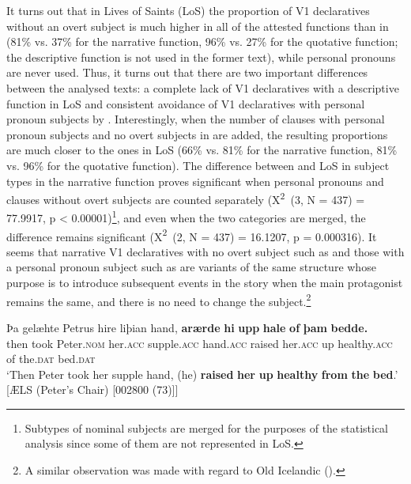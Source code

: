 \documentclass[output=paper,colorlinks,citecolor=brown]{langscibook}
\begin{document}
{It turns out that in Lives of Saints (LoS) the proportion of V1 declaratives without an overt subject is much higher in all of the attested functions than in  (81\% vs. 37\% for the narrative function, 96\% vs. 27\% for the quotative function; the descriptive function is not used in the former text), while personal pronouns are never used. Thus, it turns out that there are two important differences between the analysed texts: a complete lack of V1 declaratives with a descriptive function in LoS and consistent avoidance of V1 declaratives with personal pronoun subjects by . Interestingly, when the number of clauses with personal pronoun subjects and no overt subjects in  are added, the resulting proportions are much closer to the ones in LoS (66\% vs. 81\% for the narrative function, 81\% vs. 96\% for the quotative function). The difference between  and LoS in subject types in the narrative function proves significant when personal pronouns and clauses without overt subjects are counted separately (X}{\textsuperscript{2}}{~(3, N = 437) = 77.9917, p < 0.00001)}\footnote{ {Subtypes of nominal subjects are merged for the purposes of the statistical analysis since some of them are not represented in LoS.}}{, and even when the two categories are merged, the difference remains significant (X}{\textsuperscript{2}}{~(2, N = 437) = 16.1207, p = 0.000316). It seems that narrative V1 declaratives with no overt subject such as  and those with a personal pronoun subject such as  are variants of the same structure whose purpose is to introduce subsequent events in the story when the main protagonist remains the same, and there is no need to change the subject.}\footnote{ {A similar observation was made with regard to Old Icelandic (\citealt{booth-beck20200jhs}).}}

\ea%
\label{ex:cichosz:18}
\gll Þa   gelæhte   Petrus     hire     liþian     hand,
\textbf{arærde}   \textbf{hi}     \textbf{upp}   \textbf{hale}
\textbf{of}   \textbf{þam}     \textbf{bedde.}\\
then  took    Peter.\textsc{nom}  her.\textsc{acc}  supple.\textsc{acc}  hand.\textsc{acc}
raised    her.\textsc{acc}  up  healthy.\textsc{acc}   of  the.\textsc{dat}  bed.\textsc{dat}\\
\glt ‘Then Peter took her supple hand, (he) \textbf{raised} \textbf{her} \textbf{up} \textbf{healthy} \textbf{from} \textbf{the} \textbf{bed}.' \hfill [ÆLS (Peter's Chair) [002800 (73)]]
\z 
\end{document}
